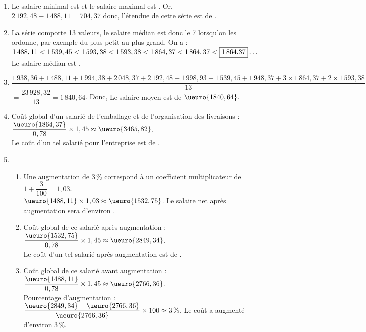\ \\ [-5mm]
   \begin{enumerate}
      \item Le salaire minimal est  et le salaire maximal est . Or, $2\,192,48-1\,488,11 =704,37$ donc, {\blue l'étendue de cette série est de }.
      \item La série comporte 13 valeurs, le salaire médian est donc le 7 lorsqu'on les ordonne, par exemple du plus petit au plus grand. On a : $1\,488,11 < 1\,539,45 <1\,593,38 < 1\,593,38 < 1\,864,37 < 1\,864,37 < \fbox{1\,864,37}\dots$ \\
         {\blue Le salaire médian est }. \smallskip
      \item $\dfrac{1\,938,36+1\,488,11+1\,994,38+2\,048,37+2\,192,48+1\,998,93+1\,539,45+1\,948,37+3\times1\,864,37+2\times1\,593,38}{13}$ \\
         $=\dfrac{23\,928,32}{13} =1\,840,64$. Donc, {\blue Le salaire moyen est de $\ueuro{1840,64}$}.
      \item Coût global d'un salarié de l'emballage et de l'organisation des livraisons : $\dfrac{\ueuro{1864,37}}{0,78}\times1,45 \approx\ueuro{3465,82}$. \\
         {\blue Le coût d'un tel salarié pour l'entreprise est de }.
      \item
         \begin{enumerate}
            \item Une augmentation de 3\,\% correspond à un coefficient multiplicateur de $1+\dfrac{3}{100} =1,03$. \\ [1mm]
               $\ueuro{1488,11}\times1,03 \approx\ueuro{1532,75}$. {\blue Le salaire net après augmentation sera d'environ }. \smallskip
            \item Coût global de ce salarié après augmentation : $\dfrac{\ueuro{1532,75}}{0,78}\times1,45 \approx\ueuro{2849,34}$. \\ [1mm]
              {\blue Le coût d'un tel salarié après augmentation est de }. \smallskip
           \item Coût global de ce salarié avant augmentation : $\dfrac{\ueuro{1488,11}}{0,78}\times1,45 \approx\ueuro{2766,36}$. \\ [1mm]
              Pourcentage d'augmentation : $\dfrac{\ueuro{2849,34}-\ueuro{2766,36}}{\ueuro{2766,36}}\times100 \approx 3\,\%$. {\blue Le coût a augmenté d'environ 3\,\%}.
        \end{enumerate}
  \end{enumerate}
